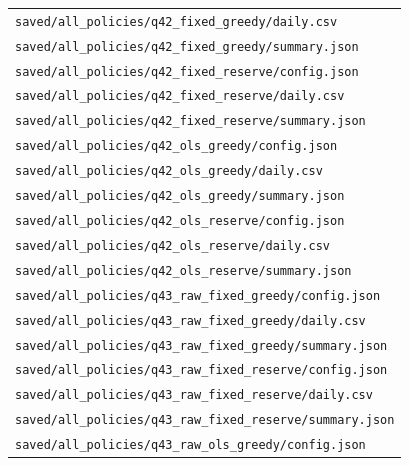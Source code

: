 \begin{longtable}{p{}}
\nolinkurl{saved/all_policies/q42_fixed_greedy/daily.csv} \\

\nolinkurl{saved/all_policies/q42_fixed_greedy/summary.json} \\

\nolinkurl{saved/all_policies/q42_fixed_reserve/config.json} \\

\nolinkurl{saved/all_policies/q42_fixed_reserve/daily.csv} \\

\nolinkurl{saved/all_policies/q42_fixed_reserve/summary.json} \\

\nolinkurl{saved/all_policies/q42_ols_greedy/config.json} \\

\nolinkurl{saved/all_policies/q42_ols_greedy/daily.csv} \\

\nolinkurl{saved/all_policies/q42_ols_greedy/summary.json} \\

\nolinkurl{saved/all_policies/q42_ols_reserve/config.json} \\

\nolinkurl{saved/all_policies/q42_ols_reserve/daily.csv} \\

\nolinkurl{saved/all_policies/q42_ols_reserve/summary.json} \\

\nolinkurl{saved/all_policies/q43_raw_fixed_greedy/config.json} \\

\nolinkurl{saved/all_policies/q43_raw_fixed_greedy/daily.csv} \\

\nolinkurl{saved/all_policies/q43_raw_fixed_greedy/summary.json} \\

\nolinkurl{saved/all_policies/q43_raw_fixed_reserve/config.json} \\

\nolinkurl{saved/all_policies/q43_raw_fixed_reserve/daily.csv} \\

\nolinkurl{saved/all_policies/q43_raw_fixed_reserve/summary.json} \\

\nolinkurl{saved/all_policies/q43_raw_ols_greedy/config.json} \\


\end{longtable}
